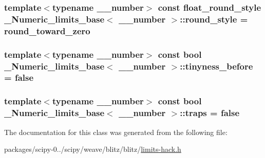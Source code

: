 \subsubsection[{round\+\_\+style}]{\setlength{\rightskip}{0pt plus 5cm}template$<$typename \+\_\+\+\_\+number$>$ const {\bf float\+\_\+round\+\_\+style} {\bf \+\_\+\+Numeric\+\_\+limits\+\_\+base}$<$ \+\_\+\+\_\+number $>$\+::round\+\_\+style = {\bf round\+\_\+toward\+\_\+zero}\hspace{0.3cm}{\ttfamily [static]}}\label{class__Numeric__limits__base_a1fcd74812fb460513c9ec0d0fae0f41b}
\hypertarget{class__Numeric__limits__base_a33e6e73154533a827289298c8298a6ec}{}
\subsubsection[{tinyness\+\_\+before}]{\setlength{\rightskip}{0pt plus 5cm}template$<$typename \+\_\+\+\_\+number$>$ const {\bf bool} {\bf \+\_\+\+Numeric\+\_\+limits\+\_\+base}$<$ \+\_\+\+\_\+number $>$\+::tinyness\+\_\+before = {\bf false}\hspace{0.3cm}{\ttfamily [static]}}\label{class__Numeric__limits__base_a33e6e73154533a827289298c8298a6ec}
\hypertarget{class__Numeric__limits__base_a540e2f26a588908be3b5cb1c52b9406b}{}
\subsubsection[{traps}]{\setlength{\rightskip}{0pt plus 5cm}template$<$typename \+\_\+\+\_\+number$>$ const {\bf bool} {\bf \+\_\+\+Numeric\+\_\+limits\+\_\+base}$<$ \+\_\+\+\_\+number $>$\+::traps = {\bf false}\hspace{0.3cm}{\ttfamily [static]}}\label{class__Numeric__limits__base_a540e2f26a588908be3b5cb1c52b9406b}


The documentation for this class was generated from the following file\+:\begin{DoxyCompactItemize}
\item 
packages/scipy-\/0../scipy/weave/blitz/blitz/\hyperlink{limits-hack_8h}{limits-\/hack.\+h}\end{DoxyCompactItemize}
